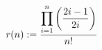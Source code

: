 \documentclass[preview]{standalone}
\begin{document}
\begin{align*}
r(n) := \frac{\displaystyle\prod_{i=1}^{n} \left(\frac{2i-1}{2i}\right)}{n!} \newline
\end{align*}
\end{document}
